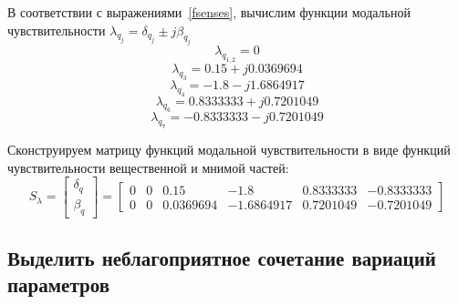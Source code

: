 В соответствии с выражениями~\ref{fsenses}, вычислим функции модальной чувствительности $\lambda_{q_j} = \delta_{q_j} \pm j \beta_{q_j}$
\begin{equation}
	\lambda_{q_{1,2}} = 0
\end{equation}
\begin{equation}
\lambda_{q_3} = 0.15 + j 0.0369694 
\end{equation}
\begin{equation}
\lambda_{q_4} =  - 1.8 - j  1.6864917 
\end{equation}
\begin{equation}
\lambda_{q_6} = 0.8333333 + j 0.7201049 
\end{equation}
\begin{equation}
\lambda_{q_7} = - 0.8333333  - j 0.7201049  
\end{equation}

Сконструируем матрицу функций модальной чувствительности в виде функций чувствительности вещественной и мнимой частей:
\begin{equation}
	S_{\lambda} = 
	\begin{bmatrix}
	\delta_q\\
	\beta_q
	\end{bmatrix}
	=
	\begin{bmatrix}
	0&0& 0.15 &- 1.8  & 0.8333333 &  - 0.8333333\\
	0&0& 0.0369694 &-1.6864917&  0.7201049 & -0.7201049  
	\end{bmatrix}
\end{equation}

\subsection{Выделить неблагоприятное сочетание вариаций параметров}

